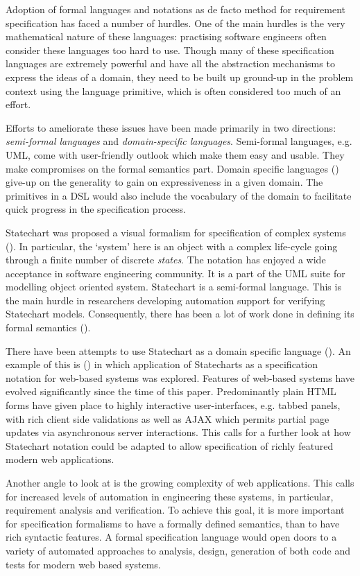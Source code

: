\documentclass[12pt,a4paper]{report}
\begin{document}
Adoption of formal languages and notations as de facto method for requirement specification has faced a number of hurdles. One of the main hurdles is the very mathematical nature of these languages: practising software engineers often consider these languages too hard to use. Though many of these specification languages are extremely powerful and have all the abstraction mechanisms to express the ideas of a domain, they need to be built up ground-up in the problem context using the language primitive, which is often considered too much of an effort.

Efforts to ameliorate these issues have been made primarily in two directions: \emph{semi-formal languages} and \emph{domain-specific languages}. Semi-formal languages, e.g. UML, come with user-friendly outlook which make them easy and usable. They make compromises on the formal semantics part. Domain specific languages () give-up on the generality to gain on expressiveness in a given domain. The primitives in a DSL would also include the vocabulary of the domain to facilitate quick progress in the specification process.

Statechart was proposed a visual formalism for specification of complex systems (). In particular, the `system' here is an object with a complex life-cycle going through a finite number of discrete \emph{states}. The notation has enjoyed a wide acceptance in software engineering community. It is a part of the UML suite for modelling object oriented system. Statechart is a semi-formal language. This is the main hurdle in researchers developing automation support for verifying Statechart models. Consequently, there has been a lot of work done in defining its formal semantics ().

There have been attempts to use Statechart as a domain specific language (). An example of this is () in which application of Statecharts as a specification notation for web-based systems was explored. Features of web-based systems have evolved significantly since the time of this paper. Predominantly plain HTML forms have given place to highly interactive user-interfaces, e.g. tabbed panels, with rich client side validations as well as AJAX which permits partial page updates via asynchronous server interactions. This calls for a further look at how Statechart notation could be adapted to allow specification of richly featured modern web applications.

Another angle to look at is the growing complexity of web applications. This calls for increased levels of automation in engineering these systems, in particular, requirement analysis and verification. To achieve this goal, it is more important for specification formalisms to have a formally defined semantics,  than to have rich syntactic features. A formal specification language would open doors to a variety of automated approaches to analysis, design, generation of both code and tests for modern web based systems.
\end{document}
